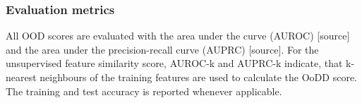 \subsubsection*{Evaluation metrics}
All OOD scores are evaluated with the area under the curve (AUROC) [source] and the area under the precision-recall curve (AUPRC) [source].
For the unsupervised feature similarity score, AUROC-k and AUPRC-k indicate, that k-nearest neighbours of the training features are used to calculate the OoDD score.
The training and test accuracy is reported whenever applicable.